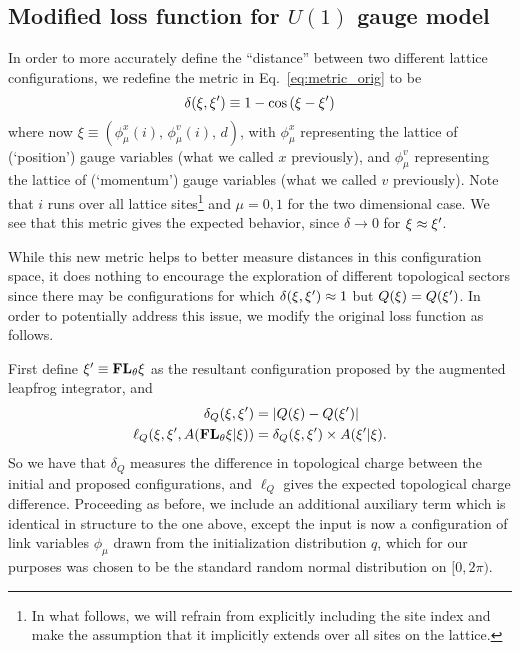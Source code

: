 \documentclass[../main.tex]{subfiles}
\begin{document}
\subsection{Modified loss function for \texorpdfstring{$U(1)$}{U (1)} gauge
model}%
\label{subsec:l2hmc_modifiedloss}
%
In order to more accurately define the ``distance'' between two different
lattice configurations, we redefine the metric in Eq.~\ref{eq:metric_orig} to
be
%
\begin{equation}
  \delta(\xi, {\xi^{\prime}}) \equiv 1 - \cos\left(\xi - \xi^{\prime}\right)
\label{eq:metric_new}
\end{equation}
%
where now $\xi \equiv {\left(\phi_{\mu}^{x}(i), \,\phi_{\mu}^{v}(i),\,
d\right)}$, with $\phi_{\mu}^{x}$ representing the lattice of (`position')
gauge variables (what we called $x$ previously), and $\phi_{\mu}^{v}$
representing the lattice of (`momentum') gauge variables (what we called $v$
previously). Note that $i$ runs over all lattice sites\footnote{In what
  follows, we will refrain from explicitly including the site index and make
  the assumption that it implicitly extends over all sites on the lattice.} and
  $\mu=0, 1$ for the two dimensional case.
%
We see that this metric gives the expected behavior, since $\delta \rightarrow
0$ for $\xi \approx {\xi^{\prime}}$.

While this new metric helps to better measure distances in this configuration
space, it does nothing to encourage the exploration of different topological
sectors since there may be configurations for which $\delta(\xi, {\xi^{\prime}}) \approx
1$ but $Q(\xi) = Q({\xi^{\prime}})$.
%
In order to potentially address this issue, we modify the original loss
function as follows.


First define ${\xi^{\prime}}\equiv {\mathbf{FL}_{\theta}} \xi$ as the resultant configuration proposed by
the augmented leapfrog integrator, and
%
\begin{align}
  \delta_{Q}{(\xi, \xi^{\prime})} &= \left|Q{(\xi)} - Q{(\xi^{\prime})}\right| \\
  \ell_{Q}{\left(\xi, {\xi^{\prime}}, A{({\mathbf{FL}_{\theta}}\xi|\xi)}\right)} &= \delta_{Q}{(\xi,{\xi^{\prime}})}
    \times A{({\xi^{\prime}}|\xi)}.
\end{align}
%
So we have that $\delta_{Q}$ measures the difference in topological charge
between the initial and proposed configurations, and $\ell_{Q}$ gives the
expected topological charge difference.
%
Proceeding as before, we include an additional auxiliary term which is
identical in structure to the one above, except the input is now a
configuration of link variables $\phi_{\mu}$ drawn from the initialization
distribution $q$, which for our purposes was chosen to be the standard random
normal distribution on $[0, 2\pi)$. %
\end{document}
